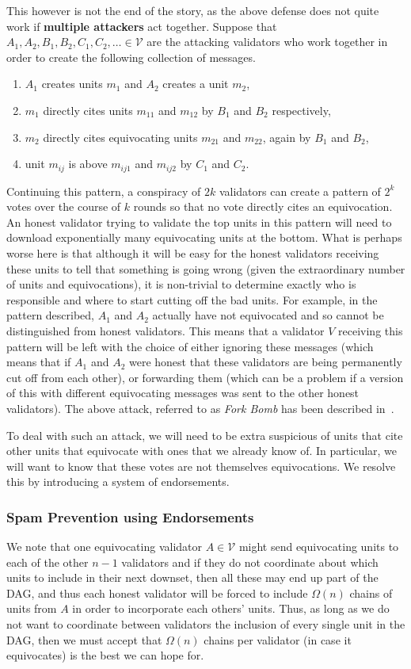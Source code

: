 \documentclass[12pt, fleqn]{article}
\newcommand{\cV}{\mathcal{V}}
\begin{document}
This however is not the end of the story, as the above defense does not quite work if {\bf multiple attackers} act together.
%
Suppose that $A_1,A_2,B_1,B_2,C_1,C_2,\ldots \in \cV$ are the attacking validators who work together in order to create the following collection of messages. 
\begin{enumerate}
    \item $A_1$ creates units $m_1$ and $A_2$ creates a unit $m_2$,
    \item $m_1$ directly cites units $m_{11}$ and $m_{12}$ by $B_1$ and $B_2$ respectively,
    \item $m_2$ directly cites equivocating units $m_{21}$ and $m_{22}$, again by $B_1$ and $B_2$,
    \item unit $m_{ij}$ is above $m_{ij1}$ and $m_{ij2}$ by $C_1$ and $C_2$.
\end{enumerate}
Continuing this pattern, a conspiracy of $2k$ validators can create a pattern of $2^k$ votes over the course of $k$ rounds so that no vote directly cites an equivocation.
%
An honest validator trying to validate the top units in this pattern will need to download exponentially many equivocating units at the bottom.
%
What is perhaps worse here is that although it will be easy for the honest validators receiving these units to tell that something is going wrong (given the extraordinary number of units and equivocations), it is non-trivial to determine exactly who is responsible and where to start cutting off the bad units.
%
For example, in the pattern described, $A_1$ and $A_2$ actually have not equivocated and so cannot be distinguished from honest validators.
%
This means that a validator $V$ receiving this pattern will be left with the choice of either ignoring these messages (which means that if $A_1$ and $A_2$ were honest that these validators are being permanently cut off from each other), or forwarding them (which can be a problem if a version of this with different equivocating messages was sent to the other honest validators).
%
The above attack, referred to as {\it Fork Bomb} has been described in~\cite{GLSS19}.

To deal with such an attack, we will need to be extra suspicious of units that cite other units that equivocate with ones that we already know of.
%
In particular, we will want to know that these votes are not themselves equivocations.
%
We resolve this by introducing a system of endorsements.


\subsubsection{Spam Prevention using Endorsements}\label{sec:endorse}
We note that one equivocating validator $A\in \cV$ might send equivocating units to each of the other $n-1$ validators and if they do not coordinate about which units to include in their next downset, then all these may end up part of the DAG, and thus each honest validator will be forced to include $\Omega(n)$ chains of units from $A$ in order to incorporate each others' units.
%
Thus, as long as we do not want to coordinate between validators the inclusion of every single unit in the DAG, then we must accept that $\Omega(n)$ chains per validator (in case it equivocates) is the best we can hope for.
%
\end{document}
